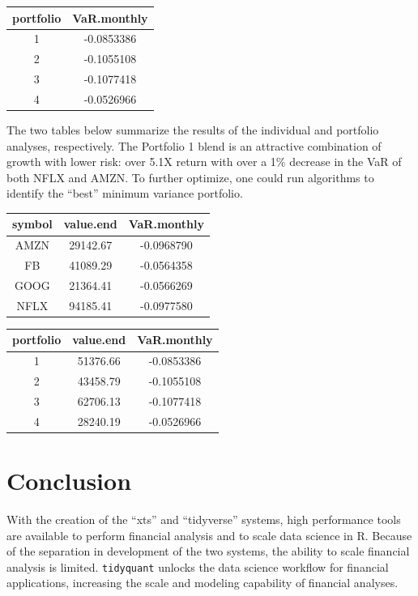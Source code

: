 \begin{tabular}{cc}
\toprule
portfolio & VaR.monthly\\
\midrule
1 & -0.0853386\\
2 & -0.1055108\\
3 & -0.1077418\\
4 & -0.0526966\\
\bottomrule
\end{tabular}

\hspace{20 mm}

The two tables below summarize the results of the individual and
portfolio analyses, respectively. The Portfolio 1 blend is an attractive
combination of growth with lower risk: over 5.1X return with over a 1\%
decrease in the VaR of both NFLX and AMZN. To further optimize, one
could run algorithms to identify the ``best'' minimum variance
portfolio.

\hspace{20 mm}

\begin{tabular}{ccc}
\toprule
symbol & value.end & VaR.monthly\\
\midrule
AMZN & 29142.67 & -0.0968790\\
FB & 41089.29 & -0.0564358\\
GOOG & 21364.41 & -0.0566269\\
NFLX & 94185.41 & -0.0977580\\
\bottomrule
\end{tabular}

\hspace{20 mm}

\begin{tabular}{ccc}
\toprule
portfolio & value.end & VaR.monthly\\
\midrule
1 & 51376.66 & -0.0853386\\
2 & 43458.79 & -0.1055108\\
3 & 62706.13 & -0.1077418\\
4 & 28240.19 & -0.0526966\\
\bottomrule
\end{tabular}

\hspace{20 mm}

\section{Conclusion}\label{conclusion}

With the creation of the ``xts'' and ``tidyverse'' systems, high
performance tools are available to perform financial analysis and to
scale data science in R. Because of the separation in development of the
two systems, the ability to scale financial analysis is limited.
\texttt{tidyquant} unlocks the data science workflow for financial
applications, increasing the scale and modeling capability of financial
analyses.

